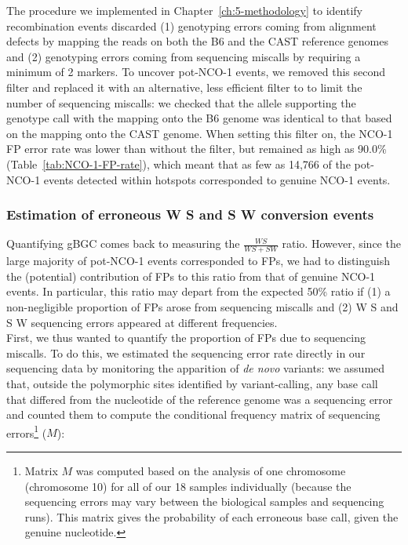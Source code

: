 The procedure we implemented in Chapter~\ref{ch:5-methodology} to identify recombination events discarded (1) genotyping errors coming from alignment defects by mapping the reads on both the B6 and the CAST reference genomes and (2) genotyping errors coming from sequencing miscalls by requiring a minimum of 2 markers.
To uncover pot-NCO-1 events, we removed this second filter and replaced it with an alternative, less efficient filter to to limit the number of sequencing miscalls: we checked that the allele supporting the genotype call with the mapping onto the B6 genome was identical to that based on the mapping onto the CAST genome.
When setting this filter on, the NCO-1 FP error rate was lower than without the filter, but remained as high as 90.0\% (Table~\ref{tab:NCO-1-FP-rate}), which meant that as few as 14,766 of the pot-NCO-1 events detected within hotspots corresponded to genuine NCO-1 events.



\subsubsection{Estimation of erroneous W\textrightarrow{} S and S\textrightarrow{} W conversion events}

Quantifying gBGC comes back to measuring the $\frac{WS}{WS+SW}$ ratio.
However, since the large majority of pot-NCO-1 events corresponded to FPs, we had to distinguish the (potential) contribution of FPs to this ratio from that of genuine NCO-1 events.
In particular, this ratio may depart from the expected 50\% ratio if (1) a non-negligible proportion of FPs arose from sequencing miscalls and (2) W\textrightarrow{} S and S\textrightarrow{} W sequencing errors appeared at different frequencies.\\

First, we thus wanted to quantify the proportion of FPs due to sequencing miscalls.
To do this, we estimated the sequencing error rate directly in our sequencing data by monitoring the apparition of \textit{de novo} variants:
we assumed that, outside the polymorphic sites identified by variant-calling, any base call that differed from the nucleotide of the reference genome was a sequencing error and counted them to compute the conditional frequency matrix of sequencing errors\footnote{Matrix $M$ was computed based on the analysis of one chromosome (chromosome 10) for all of our 18 samples individually (because the sequencing errors may vary between the biological samples and sequencing runs). This matrix gives the probability of each erroneous base call, given the genuine nucleotide.} ($M$):


